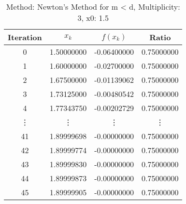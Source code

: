 \begin{table}
\centering
\caption{Method: Newton's Method for m < d, Multiplicity: 3, x0: 1.5}
\label{tab:table_Newton's_Method_for_m_<_d_3_1_5}
\begin{tabular}{c c c c}
\toprule
Iteration &      $x_k$ &    $f(x_k)$ &      Ratio \\
\midrule
        0 & 1.50000000 & -0.06400000 & 0.75000000 \\
        1 & 1.60000000 & -0.02700000 & 0.75000000 \\
        2 & 1.67500000 & -0.01139062 & 0.75000000 \\
        3 & 1.73125000 & -0.00480542 & 0.75000000 \\
        4 & 1.77343750 & -0.00202729 & 0.75000000 \\
   \vdots &     \vdots &      \vdots &     \vdots \\
       41 & 1.89999698 & -0.00000000 & 0.75000000 \\
       42 & 1.89999774 & -0.00000000 & 0.75000000 \\
       43 & 1.89999830 & -0.00000000 & 0.75000000 \\
       44 & 1.89999873 & -0.00000000 & 0.75000000 \\
       45 & 1.89999905 & -0.00000000 & 0.75000000 \\
\bottomrule
\end{tabular}
\end{table}
